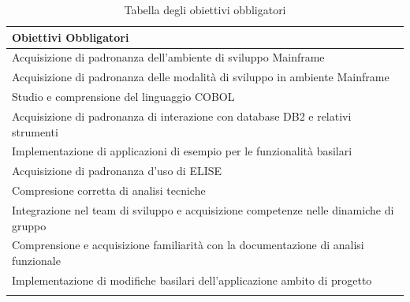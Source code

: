 		\begin{center}
		  \bgroup
		  \def\arraystretch{1.4}
		   \begin{longtable}{ | p{11cm} |} \hline
		   
		    \cellcolor[gray]{0.9} \textbf{Obiettivi Obbligatori} \\ \hline

			 Acquisizione di padronanza dell'ambiente di sviluppo Mainframe  \\ \hline
			 Acquisizione di padronanza delle modalità di sviluppo in ambiente Mainframe \\ \hline
			 Studio e comprensione del linguaggio COBOL \\ \hline
			 Acquisizione di padronanza di interazione con database DB2 e relativi strumenti \\ \hline
			 Implementazione di applicazioni di esempio per le funzionalità basilari \\ \hline
			 Acquisizione di padronanza d'uso di ELISE \\ \hline
			 Compresione corretta di analisi tecniche \\ \hline
			 Integrazione nel team di sviluppo e acquisizione competenze nelle dinamiche di gruppo \\ \hline
			 Comprensione e acquisizione familiarità con la documentazione di analisi funzionale \\ \hline
			 Implementazione di modifiche basilari dell'applicazione ambito di progetto \\ \hline
			
			\caption{Tabella degli obiettivi obbligatori}
			
		    \end{longtable}
		  \egroup
		\end{center}
		

